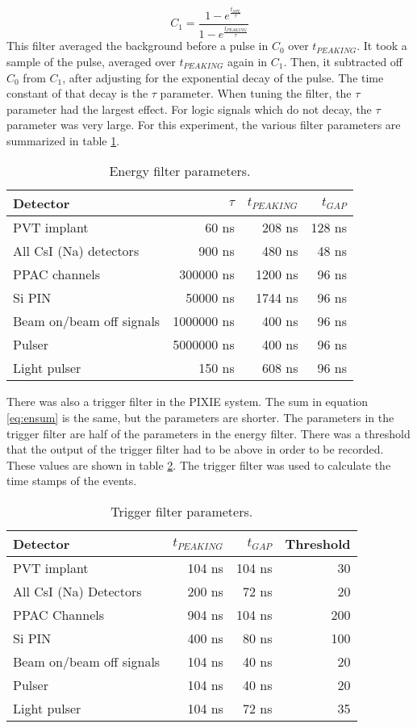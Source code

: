 \documentclass[../MaxHughesThesis.tex]{subfiles}
\begin{document}
\begin{equation}
	C_{1} = \frac{1 - e^{\frac{t_{SPL}}{\tau}}}{1 - e^{\frac{t_{PEAKING}}{\tau}}}
	\label{eq:c1sum}
\end{equation}
%
This filter averaged the background before a pulse in $C_{0}$ over $t_{PEAKING}$.
It took a sample of the pulse, averaged over $t_{PEAKING}$ again in $C_{1}$.
Then, it subtracted off $C_{0}$ from $C_{1}$, after adjusting for the exponential decay of the pulse.
The time constant of that decay is the $\tau$ parameter.
When tuning the filter, the $\tau$ parameter had the largest effect.
For logic signals which do not decay, the $\tau$ parameter was very large.
For this experiment, the various filter parameters are summarized in table \ref{tab:pixieparams}.  
%
\begin{table}[!hbt]
	\centering
	\caption{Energy filter parameters.}
		\begin{tabular}{lrrr}
			Detector & $\tau$ & $t_{PEAKING}$ & $t_{GAP}$ \\ \hline
			PVT implant & 60 ns & 208 ns & 128 ns \\
			All CsI (Na) detectors & 900 ns & 480 ns & 48 ns \\
			PPAC channels & 300000 ns & 1200 ns & 96 ns \\ 
			Si PIN & 50000 ns & 1744 ns & 96 ns \\
			Beam on/beam off signals & 1000000 ns & 400 ns & 96 ns \\
			Pulser & 5000000 ns & 400 ns & 96 ns \\
			Light pulser & 150 ns & 608 ns & 96 ns 
		\end{tabular}	
		\label{tab:pixieparams}
\end{table}
%
There was also a trigger filter in the PIXIE system.
The sum in equation \ref{eq:ensum} is the same, but the parameters are shorter.
The parameters in the trigger filter are half of the parameters in the energy filter.
There was a threshold that the output of the trigger filter had to be above in order to be recorded.
These values are shown in table \ref{tab:trigfilter}.
The trigger filter was used to calculate the time stamps of the events.  
%
\begin{table}[!hbt]
	\centering
	\caption{Trigger filter parameters.}
		\begin{tabular}{lrrr}
			Detector & $t_{PEAKING}$ & $t_{GAP}$ & Threshold\\ \hline
			PVT implant & 104 ns & 104 ns & 30 \\ 
			All CsI (Na) Detectors & 200 ns & 72 ns & 20 \\
			PPAC Channels & 904 ns & 104 ns & 200 \\ 
			Si PIN & 400 ns & 80 ns & 100 \\
			Beam on/beam off signals & 104 ns & 40 ns & 20 \\
			Pulser & 104 ns & 40 ns & 20 \\
			Light pulser & 104 ns & 72 ns & 35
		\end{tabular}	
		\label{tab:trigfilter}
\end{table}
%
\end{document}
